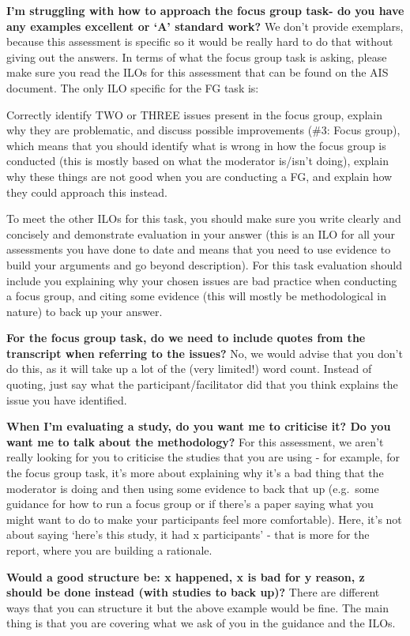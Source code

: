 \documentclass[
  english,
  letterpaper,
  DIV=11,
  numbers=noendperiod]{scrreprt}
\begin{document}
\textbf{I'm struggling with how to approach the focus group task- do you
have any examples excellent or `A' standard work?} We don't provide
exemplars, because this assessment is specific so it would be really
hard to do that without giving out the answers. In terms of what the
focus group task is asking, please make sure you read the ILOs for this
assessment that can be found on the AIS document. The only ILO specific
for the FG task is:

Correctly identify TWO or THREE issues present in the focus group,
explain why they are problematic, and discuss possible improvements
(\#3: Focus group), which means that you should identify what is wrong
in how the focus group is conducted (this is mostly based on what the
moderator is/isn't doing), explain why these things are not good when
you are conducting a FG, and explain how they could approach this
instead.

To meet the other ILOs for this task, you should make sure you write
clearly and concisely and demonstrate evaluation in your answer (this is
an ILO for all your assessments you have done to date and means that you
need to use evidence to build your arguments and go beyond description).
For this task evaluation should include you explaining why your chosen
issues are bad practice when conducting a focus group, and citing some
evidence (this will mostly be methodological in nature) to back up your
answer.

\textbf{For the focus group task, do we need to include quotes from the
transcript when referring to the issues?} No, we would advise that you
don't do this, as it will take up a lot of the (very limited!) word
count. Instead of quoting, just say what the participant/facilitator did
that you think explains the issue you have identified.

\textbf{When I'm evaluating a study, do you want me to criticise it? Do
you want me to talk about the methodology?} For this assessment, we
aren't really looking for you to criticise the studies that you are
using - for example, for the focus group task, it's more about
explaining why it's a bad thing that the moderator is doing and then
using some evidence to back that up (e.g.~some guidance for how to run a
focus group or if there's a paper saying what you might want to do to
make your participants feel more comfortable). Here, it's not about
saying `here's this study, it had x participants' - that is more for the
report, where you are building a rationale.

\textbf{Would a good structure be: x happened, x is bad for y reason, z
should be done instead (with studies to back up)?} There are different
ways that you can structure it but the above example would be fine. The
main thing is that you are covering what we ask of you in the guidance
and the ILOs.
\end{document}
